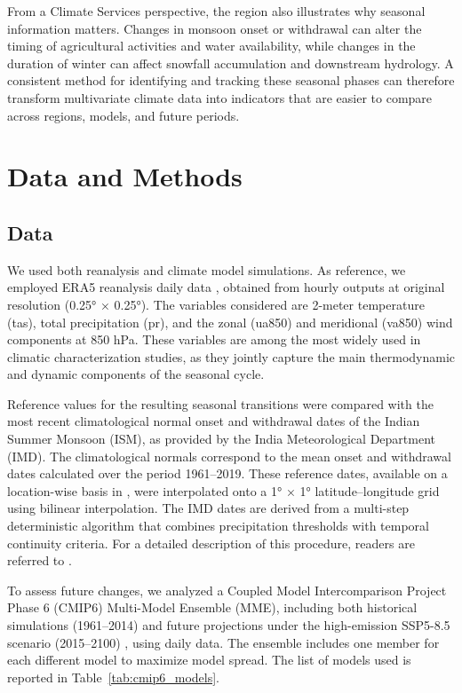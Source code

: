 From a Climate Services perspective, the region also illustrates why seasonal information matters. Changes in monsoon onset or withdrawal can alter the timing of agricultural activities and water availability, while changes in the duration of winter can affect snowfall accumulation and downstream hydrology. A consistent method for identifying and tracking these seasonal phases can therefore transform multivariate climate data into indicators that are easier to compare across regions, models, and future periods.

\section{Data and Methods}

\subsection{Data}
We used both reanalysis and climate model simulations.
As reference, we employed ERA5 reanalysis daily data \citep{hersbach_era5_2020}, obtained from hourly outputs at original resolution (0.25° × 0.25°).
The variables considered are 2-meter temperature (tas), total precipitation (pr), and the zonal (ua850) and meridional (va850) wind components at 850 hPa.
These variables are among the most widely used in climatic characterization studies, as they jointly capture the main thermodynamic and dynamic components of the seasonal cycle. 

Reference values for the resulting seasonal transitions were compared with the most recent climatological normal onset and withdrawal dates of the Indian Summer Monsoon (ISM), as provided by the India Meteorological Department (IMD). The climatological normals correspond to the mean onset and withdrawal dates calculated over the period 1961–2019. These reference dates, available on a location-wise basis in \citet{pai_normal_2020}, were interpolated onto a 1° × 1° latitude–longitude grid using bilinear interpolation. The IMD dates are derived from a multi-step deterministic algorithm that combines precipitation thresholds with temporal continuity criteria. For a detailed description of this procedure, readers are referred to \citet{pai_normal_2020}.

To assess future changes, we analyzed a Coupled Model Intercomparison Project Phase 6 (CMIP6) Multi-Model Ensemble (MME), including both historical simulations (1961--2014) \citep{eyring_overview_2016} and future projections under the high-emission SSP5-8.5 scenario (2015--2100) \citep{oneill_scenario_2016}, using daily data. The ensemble includes one member for each different model to maximize model spread. 
The list of models used is reported in Table~\ref{tab:cmip6_models}.  

